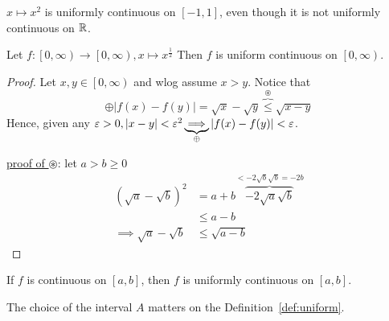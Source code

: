 \begin{remark*}
    $x \mapsto x^2$ is uniformly continuous on $\left[-1, 1\right]$, even though it is not uniformly continuous on $\mathbb R$. 
\end{remark*}

\begin{example}
    Let $f: \left[0, \infty\right) \to \left[0, \infty\right), x \mapsto x^{\frac{1}{2}}$ 
    Then $f$ is uniform continuous on $\left[0, \infty\right)$.
\end{example}

\begin{proof}
    Let $x, y \in \left[0, \infty\right)$ and wlog assume $x > y$. Notice that 
    $$\oplus |f(x) - f(y)| = \sqrt{x} - \sqrt{y} \overbrace{\leq}^{\circledast } \sqrt{x-y}$$
    Hence, given any $\varepsilon > 0, |x-y| < \varepsilon^2 \underbrace{\implies}_{\oplus} |f(x) - f(y)| < \varepsilon$.

    \underline{proof of $\circledast$}: let $a > b \geq 0$
    \begin{align*}
    (\sqrt{a} - \sqrt{b})^2 &= a + b \overbrace{- 2\sqrt{a}\sqrt{b}}^{ < -2\sqrt{b}\sqrt{b} = -2b} \\
    &\leq a - b \\
    \implies \sqrt{a} - \sqrt{b} &\leq \sqrt{a - b}
    \end{align*}
\end{proof}

\begin{theorem}
    If $f$ is continuous on $\left[a, b\right]$, then $f$ is uniformly continuous on $\left[a, b\right]$.
\end{theorem}

The choice of the interval $A$ matters on the Definition~\ref{def:uniform}.


